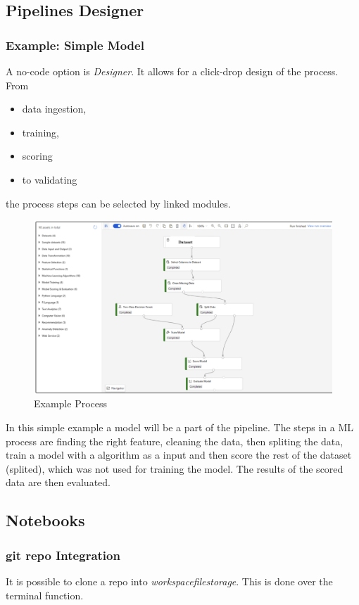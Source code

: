 \subsection{Pipelines Designer}
\subsubsection{Example: Simple Model}
A no-code option is \textit{Designer}. It allows for a click-drop design of the process. From 
\begin{itemize}
	\item data ingestion,
	\item training,
	\item scoring
	\item to validating
\end{itemize}
the process steps can be selected by linked modules.

\begin{figure}[H]
	\centering
	\includegraphics[scale = 0.3]{attachment/chapter_10/Scc005}
	\caption{Example Process}
\end{figure}

In this simple example a model will be a part of the pipeline. The steps in a \gls{ML} process are finding the right feature, cleaning the data, then spliting the data, train a model with a algorithm as a input and then score the rest of the dataset (splited), which was not used for training the model. The results of the scored data are then evaluated.

\subsection{Notebooks}
\subsubsection{git repo Integration}
It is possible to clone a repo into \textit{workspacefilestorage}. This is done over the terminal function.

